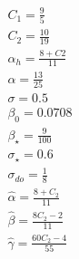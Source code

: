 \documentclass[%
notitlepage,
]{revtex4-1}
\begin{document}
\begin{eqnarray}
    C_1 = \frac{9}{5}\\
    C_2 = \frac{10}{19}\\
    \alpha_h = \frac{8 + C2}{11}\\
    \alpha = \frac{13}{25}\\
    \sigma = 0.5\\
    \beta_0 = 0.0708\\
    \beta_\star = \frac{9}{100}\\
    \sigma_\star = 0.6\\
    \sigma_{do} = \frac{1}{8}\\
    \hat{\alpha} = \frac{8 + C_2}{11}\\
    \hat{\beta} = \frac{8C_2 - 2}{11}\\
    \hat{\gamma} = \frac{60C_2 - 4}{55}\\
\end{eqnarray}
\end{document}
